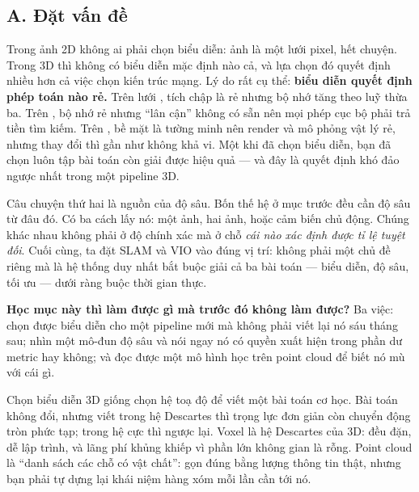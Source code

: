 \documentclass[../../../deep_learning.tex]{subfiles}
\begin{document}
\subsection{A. Đặt vấn đề}
Trong ảnh 2D không ai phải chọn biểu diễn: ảnh là một lưới pixel, hết chuyện. Trong 3D thì không có biểu diễn mặc định nào cả, và lựa chọn đó quyết định nhiều hơn cả việc chọn kiến trúc mạng. Lý do rất cụ thể: \textbf{biểu diễn quyết định phép toán nào rẻ.} Trên lưới , tích chập là rẻ nhưng bộ nhớ tăng theo luỹ thừa ba. Trên , bộ nhớ rẻ nhưng ``lân cận'' không có sẵn nên mọi phép cục bộ phải trả tiền tìm kiếm. Trên , bề mặt là tường minh nên render và mô phỏng vật lý rẻ, nhưng thay đổi  thì gần như không khả vi. Một khi đã chọn biểu diễn, bạn đã chọn luôn tập bài toán còn giải được hiệu quả --- và đây là quyết định khó đảo ngược nhất trong một pipeline 3D.

Câu chuyện thứ hai là nguồn của độ sâu. Bốn thế hệ ở mục trước đều cần độ sâu từ đâu đó. Có ba cách lấy nó: một ảnh, hai ảnh, hoặc cảm biến chủ động. Chúng khác nhau không phải ở độ chính xác mà ở chỗ \emph{cái nào xác định được tỉ lệ tuyệt đối}. Cuối cùng, ta đặt SLAM và VIO vào đúng vị trí: không phải một chủ đề riêng mà là hệ thống duy nhất bắt buộc giải cả ba bài toán --- biểu diễn, độ sâu, tối ưu --- dưới ràng buộc thời gian thực.

\textbf{Học mục này thì làm được gì mà trước đó không làm được?} Ba việc: chọn được biểu diễn cho một pipeline mới mà không phải viết lại nó sáu tháng sau; nhìn một mô-đun độ sâu và nói ngay nó có quyền xuất hiện trong phần dư metric hay không; và đọc được một mô hình học trên point cloud để biết nó mù với cái gì.

\begin{trucgiac}
Chọn biểu diễn 3D giống chọn hệ toạ độ để viết một bài toán cơ học. Bài toán không đổi, nhưng viết trong hệ Descartes thì trọng lực đơn giản còn chuyển động tròn phức tạp; trong hệ cực thì ngược lại. Voxel là hệ Descartes của 3D: đều đặn, dễ lập trình, và lãng phí khủng khiếp vì phần lớn không gian là rỗng. Point cloud là ``danh sách các chỗ có vật chất'': gọn đúng bằng lượng thông tin thật, nhưng bạn phải tự dựng lại khái niệm hàng xóm mỗi lần cần tới nó.
\end{trucgiac}
\end{document}

